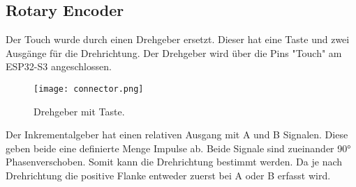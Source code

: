         \subsection{Rotary Encoder}
        Der Touch wurde durch einen Drehgeber ersetzt. Dieser hat eine Taste und zwei Ausgänge für die Drehrichtung. 
        Der Drehgeber wird über die Pins "Touch" am ESP32-S3 angeschlossen. 

            \begin{figure}[h!]
                \centering
                \texttt{[image: connector.png]}
                \caption{Drehgeber mit Taste.}
                \label{fig:sch5}

            \end{figure}
        
        Der Inkrementalgeber hat einen relativen Ausgang mit A und B Signalen. Diese geben beide
        eine definierte Menge Impulse ab. Beide Signale sind zueinander 90° Phasenverschoben. Somit
        kann die Drehrichtung bestimmt werden. Da je nach Drehrichtung die positive Flanke entweder
        zuerst bei A oder B erfasst wird.